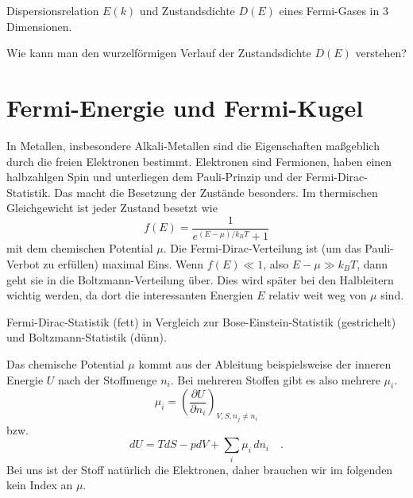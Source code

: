 \begin{marginfigure}
    \caption{Dispersionsrelation $E(k)$ und Zustandsdichte $D(E)$ eines Fermi-Gases in 3 Dimensionen.}
\end{marginfigure}


\begin{questions} 
    \item Wie kann man den wurzelförmigen Verlauf der Zustandsdichte $D(E)$ verstehen?
\end{questions}


\section*{Fermi-Energie und Fermi-Kugel}

In Metallen, insbesondere Alkali-Metallen sind die Eigenschaften maßgeblich durch die freien Elektronen bestimmt.
Elektronen sind Fermionen, haben einen halbzahlgen Spin und unterliegen  dem Pauli-Prinzip und der Fermi-Dirac-Statistik. Das macht die Besetzung der Zustände besonders. Im thermischen Gleichgewicht ist  jeder Zustand besetzt wie 
\begin{equation}
    f(E) = \frac{1}{e^{(E-\mu)/k_B T} + 1}
\end{equation}
mit dem chemischen Potential $\mu$. Die Fermi-Dirac-Verteilung ist (um das Pauli-Verbot zu erfüllen) maximal Eins. Wenn $f(E) \ll 1$, also $E- \mu \gg k_B T$, dann geht sie in die Boltzmann-Verteilung über. Dies wird später bei den Halbleitern wichtig werden, da dort die interessanten Energien $E$ relativ weit weg von $\mu$ sind.

\begin{marginfigure}
    \caption{Fermi-Dirac-Statistik (fett) in Vergleich zur Bose-Einstein-Statistik (gestrichelt) und Boltzmann-Statistik (dünn).}
\end{marginfigure}

Das chemische Potential $\mu$ kommt aus der Ableitung beispielsweise der inneren Energie $U$ nach der Stoffmenge $n_i$. Bei mehreren Stoffen gibt es also mehrere $\mu_i$.
\begin{equation}
    \mu_i = \left( \frac{\partial U}{\partial n_i} \right)_{V,S,n_j \neq n_i}
\end{equation}
bzw.
\begin{equation}
    dU = T dS - p dV + \sum_i \mu_i \, d n_i \quad .
\end{equation}
Bei uns ist der Stoff natürlich die Elektronen, daher brauchen wir im folgenden kein Index an $\mu$.

